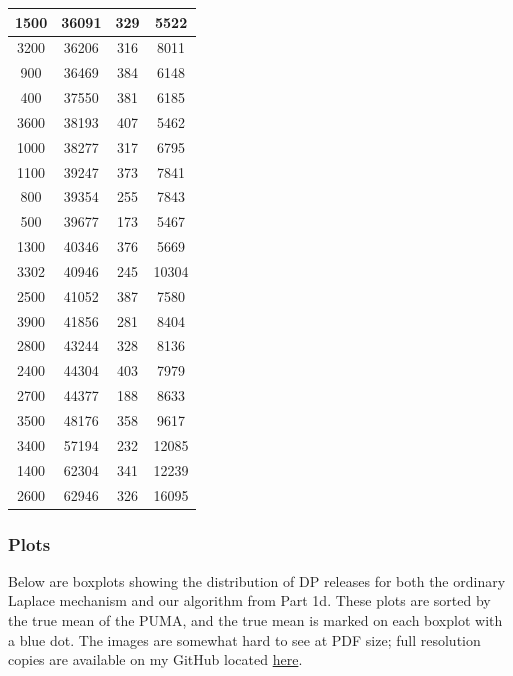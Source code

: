 \documentclass[12pt]{article}
\begin{document}
\begin{longtable}{|c|c|c|c|}
1500 & 36091 & 329 & 5522 \\ \hline
3200 & 36206 & 316 & 8011 \\ \hline
900 & 36469 & 384 & 6148 \\ \hline
400 & 37550 & 381 & 6185 \\ \hline
3600 & 38193 & 407 & 5462 \\ \hline
1000 & 38277 & 317 & 6795 \\ \hline
1100 & 39247 & 373 & 7841 \\ \hline
800 & 39354 & 255 & 7843 \\ \hline
500 & 39677 & 173 & 5467 \\ \hline
1300 & 40346 & 376 & 5669 \\ \hline
3302 & 40946 & 245 & 10304 \\ \hline
2500 & 41052 & 387 & 7580 \\ \hline
3900 & 41856 & 281 & 8404 \\ \hline
2800 & 43244 & 328 & 8136 \\ \hline
2400 & 44304 & 403 & 7979 \\ \hline
2700 & 44377 & 188 & 8633 \\ \hline
3500 & 48176 & 358 & 9617 \\ \hline
3400 & 57194 & 232 & 12085 \\ \hline
1400 & 62304 & 341 & 12239 \\ \hline
2600 & 62946 & 326 & 16095 \\ \hline
\end{longtable}

\subsubsection{Plots}

\noindent

Below are boxplots showing the distribution of DP releases for both the ordinary Laplace mechanism and our algorithm from Part 1d. These plots are sorted by the true mean of the PUMA, and the true mean is marked on each boxplot with a blue dot. The images are somewhat hard to see at PDF size; full resolution copies are available on my GitHub located \href{https://github.com/andrew-shackelford/cs208/tree/master/3}{here}.
\end{document}
